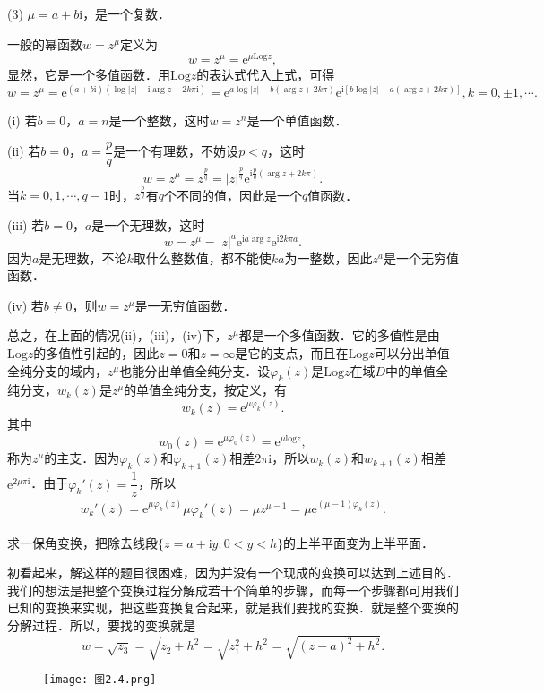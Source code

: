\documentclass[../../main.tex]{subfiles}
\begin{document}
(3) $\mu = a + b\text{i}$，是一个复数．

一般的幂函数$w = z^\mu$定义为
\[
w = z^\mu = \text{e}^{\mu \text{Log} z},
\]
显然，它是一个多值函数．用$\text{Log} z$的表达式代入上式，可得
\[
w = z^\mu = \text{e}^{(a + b\text{i})(\log |z| + \text{i}\arg z + 2k\pi \text{i})}
= \text{e}^{a\log |z| - b(\arg z + 2k\pi)} \text{e}^{\text{i}[b\log |z| + a(\arg z + 2k\pi)]},
k = 0, \pm 1, \cdots.
\]

(i) 若$b = 0$，$a = n$是一个整数，这时$w = z^n$是一个单值函数．

(ii) 若$b = 0$，$a = \dfrac{p}{q}$是一个有理数，不妨设$p < q$，这时
\[
w = z^\mu = z^{\frac{p}{q}} = |z|^{\frac{p}{q}} \text{e}^{\text{i}\frac{p}{q}(\arg z + 2k\pi)}.
\]
当$k = 0,1,\cdots,q - 1$时，$z^{\frac{p}{q}}$有$q$个不同的值，因此是一个$q$值函数．

(iii) 若$b = 0$，$a$是一个无理数，这时
\[
w = z^\mu = |z|^a \text{e}^{\text{i}a\arg z} \text{e}^{\text{i}2k\pi a}.
\]
因为$a$是无理数，不论$k$取什么整数值，都不能使$ka$为一整数，因此$z^a$是一个无穷值函数．

(iv) 若$b \neq 0$，则$w = z^\mu$是一无穷值函数．

总之，在上面的情况(ii)，(iii)，(iv)下，$z^\mu$都是一个多值函数．它的多值性是由$\text{Log} z$的多值性引起的，因此$z = 0$和$z = \infty$是它的支点，而且在$\text{Log} z$可以分出单值全纯分支的域内，$z^\mu$也能分出单值全纯分支．设$\varphi_k(z)$是$\text{Log} z$在域$D$中的单值全纯分支，$w_k(z)$是$z^\mu$的单值全纯分支，按定义，有
\[
w_k(z) = \text{e}^{\mu \varphi_k(z)}.
\]
其中
\[
w_0(z) = \text{e}^{\mu \varphi_0(z)} = \text{e}^{\mu \text{log} z},
\]
称为$z^\mu$的主支．因为$\varphi_k(z)$和$\varphi_{k + 1}(z)$相差$2\pi \text{i}$，所以$w_k(z)$和$w_{k + 1}(z)$相差$\text{e}^{2\mu \pi \text{i}}$．由于$\varphi_k'(z) = \dfrac{1}{z}$，所以
\begin{align}\label{equation:幂函数求导}
w_k'(z) = \text{e}^{\mu \varphi_k(z)} \mu \varphi_k'(z)
= \mu z^{\mu - 1}
= \mu \text{e}^{(\mu - 1)\varphi_k(z)}.
\end{align}

\begin{example}\label{example:例2.4.5}
求一保角变换，把除去线段$\{ z = a + \text{i}y: 0 < y < h \}$的上半平面变为上半平面．
\end{example}
\begin{solution}
初看起来，解这样的题目很困难，因为并没有一个现成的变换可以达到上述目的．我们的想法是把整个变换过程分解成若干个简单的步骤，而每一个步骤都可用我们已知的变换来实现，把这些变换复合起来，就是我们要找的变换．就是整个变换的分解过程．所以，要找的变换就是
\[
w = \sqrt{z_3}
= \sqrt{z_2 + h^2}
= \sqrt{z_1^2 + h^2}
= \sqrt{(z - a)^2 + h^2}.
\]
\begin{figure}[H]
\centering
\texttt{[image: 图2.4.png]}
\caption{}
\label{figure:图2.4}
\end{figure}
\end{solution}
\end{document}
